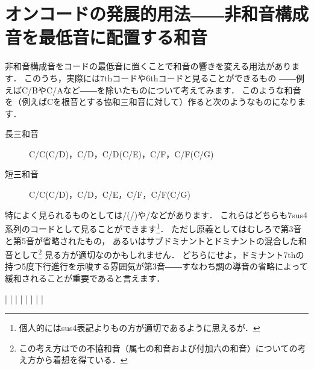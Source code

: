 \documentclass[dvipdfmx,uplatex,b5paper,openany,jbase=12Q,nomag*,textwidth-limit=44%
               ]{gachimuchi}
\begin{document}
\section{オンコードの発展的用法――非和音構成音を最低音に配置する和音}
非和音構成音をコードの最低音に置くことで和音の響きを変える用法があります．
このうち，実際には7thコードや6thコードと見ることができるもの
――例えばC/B\aFlat やC/Aなど――を除いたものについて考えてみます．
このような和音を（例えばCを根音とする協和三和音に対して）作ると次のようなものになります．

\begin{description}
  \item[長三和音] C/C\aSharp(C/D\aFlat)，C/D，C/D\aSharp(C/E\aFlat)，C/F，C/F\aSharp(C/G\aFlat)
  \item[短三和音] C\Min/C\aSharp(C\Min/D\aFlat)，C\Min/D，C\Min/E，C\Min/F，C\Min/F\aSharp(C\Min/G\aFlat)
\end{description}

特によく見られるものとしては\Gniv /\Gnv (\Gniv\Min/\Gnv )や\Gnii\Min{}/\Gnv などがあります．
これらはどちらも\Gnv\subsc7sus4系列のコードとして見ることができます\footnote{
  個人的にはsus4表記よりもの方が適切であるように思えるが．
}．
ただし原義としてはむしろ\Gnv{}で第3音と第5音が省略されたもの，
あるいはサブドミナントとドミナントの混合した和音として\footnote{%
  この考え方は\cite{chRAMEAU1}での不協和音（属七の和音および付加六の和音）についての考え方から着想を得ている．
}%
見る方が適切なのかもしれません．
どちらにせよ，ドミナント7thの持つ5度下行進行を示唆する雰囲気が第3音――すなわち調の導音の省略によって
緩和されることが重要であると言えます．

\begin{Music}%
  \generalmeter{\meterC}%
  \Startpiece
  \NOTes%
  |%
  \en%
  \NOTes%
  |%
  \en\bar%
  \Notes|%
  \en{}%
  \setdoublebar
  \endpiece
  \Startpiece%
  \NOTes%
  |%
  \en%
  \NOTes%
  |%
  \en\bar%
  \Notes|%
  \en\setdoublebar
  \endpiece
\end{Music}
\end{document}
